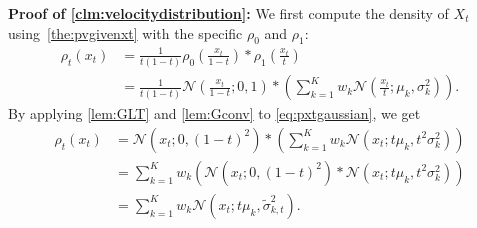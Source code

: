 \textbf{Proof of \cref{clm:velocitydistribution}:}
We first compute the density of $X_t$ using~\cref{the:pvgivenxt} with the specific $\rho_0$ and $\rho_1$:  %
\begin{align}
\label{eq:pxtgaussian}
 \rho_t(x_t) %
 & = \frac{1}{t(1-t)} \rho_0 \left( \frac{x_t}{1-t} \right)* \rho_1\left( \frac{x_t}{t}\right)   \nonumber \\
 & =  \frac{1}{t(1-t)} \mathcal{N}\left(\frac{x_t}{1-t}; 0, 1  \right) *\left(\sum_{k = 1}^K w_k \mathcal{N}\left(\frac{x_t}{t}; \mu_k, \sigma_k^2  \right) \right). 
\end{align}
By applying \cref{lem:GLT} and \cref{lem:Gconv} to \cref{eq:pxtgaussian}, we get 
\begin{align}
\label{eq:pxt2}
 \rho_t (x_t)  & = \mathcal{N}\left(x_t; 0, (1-t)^2  \right) * \left(\sum_{k = 1}^K w_k \mathcal{N}\left(x_t; t\mu_k, t^2\sigma_k^2  \right) \right)  \nonumber \\ 
 &= \sum_{k = 1}^K w_k  \left(   \mathcal{N}\left(x_t; 0, (1-t)^2  \right)  * \mathcal{N}\left(x_t; t\mu_k, t^2\sigma_k^2  \right) \right) \nonumber \\
 & = \sum_{k = 1}^K w_k \mathcal{N} \left(x_t; t\mu_k, \tilde{\sigma}_{k, t}^2 \right).
\end{align}


